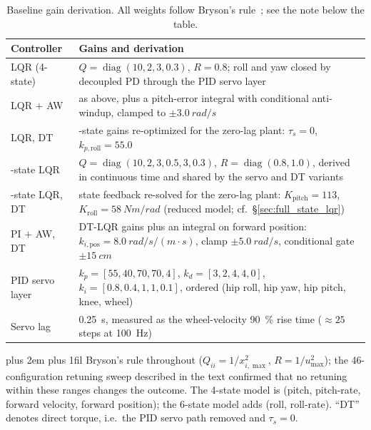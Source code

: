 \documentclass[conference]{IEEEtran}
\newcommand{\tabnote}{\par\leftskip=0pt\rightskip=0pt plus 2em%
  \parfillskip=0pt plus 1fil\relax}
\begin{document}
\begin{table}[t]
\centering
\footnotesize
\caption{Baseline gain derivation. All weights follow Bryson's rule~\cite{bryson1975optimal}; see the note below the table.}
\label{tab:baseline_gains}
\setlength{\tabcolsep}{4pt}
\begin{tabular}{@{}>{\raggedright\arraybackslash}p{1.75cm}>{\raggedright\arraybackslash}p{6.15cm}@{}}
\toprule
Controller & Gains and derivation \\
\midrule
LQR (4-state) & $Q{=}\operatorname{diag}(10,2,3,0.3)$, $R{=}0.8$; roll and yaw closed by decoupled PD through the PID servo layer \\
\addlinespace[2pt]
LQR $+$ AW & as above, plus a pitch-error integral with conditional anti-windup, clamped to $\pm\SI{3.0}{rad/s}$ \\
\addlinespace[2pt]
LQR, DT & 4-state gains re-optimized for the zero-lag plant: $\tau_s{=}0$, $k_{p,\text{roll}}{=}55.0$ \\
\addlinespace[2pt]
6-state LQR & $Q{=}\operatorname{diag}(10,2,3,0.5,3,0.3)$, $R{=}\operatorname{diag}(0.8,1.0)$, derived in continuous time and shared by the servo and DT variants \\
\addlinespace[2pt]
6-state LQR, DT & state feedback re-solved for the zero-lag plant: $K_{\text{pitch}}{=}113$, $K_{\text{roll}}{=}\SI{58}{Nm/rad}$ (reduced model; cf.\ \S\ref{sec:full_state_lqr}) \\
\addlinespace[2pt]
PI $+$ AW, DT & DT-LQR gains plus an integral on forward position: $k_{i,\text{pos}}{=}\SI{8.0}{rad/s/(m{\cdot}s)}$, clamp $\pm\SI{5.0}{rad/s}$, conditional gate $\pm\SI{15}{cm}$ \\
\midrule
PID servo layer & $k_p{=}[55,40,70,70,4]$, $k_d{=}[3,2,4,4,0]$, $k_i{=}[0.8,0.4,1,1,0.1]$, ordered (hip roll, hip yaw, hip pitch, knee, wheel) \\
\addlinespace[2pt]
Servo lag & \SI{0.25}{s}, measured as the wheel-velocity \SI{90}{\percent} rise time ($\approx\num{25}$ steps at \SI{100}{Hz}) \\
\bottomrule
\end{tabular}
\vspace{2pt}\tabnote\noindent\footnotesize
Bryson's rule throughout ($Q_{ii}{=}1/x_{i,\max}^{2}$, $R{=}1/u_{\max}^{2}$); the \num{46}-configuration retuning sweep described in the text confirmed that no retuning within these ranges changes the outcome. The 4-state model is (pitch, pitch-rate, forward velocity, forward position); the 6-state model adds (roll, roll-rate). ``DT'' denotes direct torque, i.e.\ the PID servo path removed and $\tau_s{=}0$.
\end{table}
\end{document}
